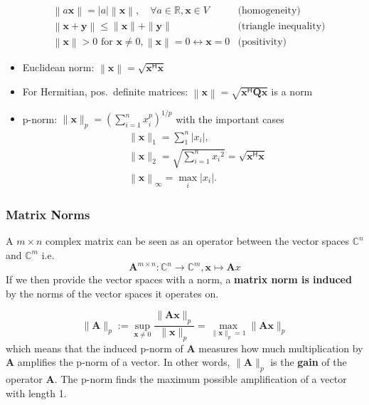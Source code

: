 \begin{align*}
     & \left\| a\mathbf{x}\right\|  =\left|a\right|\left\|\mathbf{x}\right\|,\quad\forall a\in\mathbb{R},\mathbf{x}\in V                 & \text{(homogeneity)}         \\
     & \left\|\mathbf{x}+\mathbf{y}\right\|                         \leq\|\mathbf{x}\|+\|\mathbf{y}\|                                    & \text{(triangle inequality)} \\
     & \left\|\mathbf{x}\right\|                >0 \text{ for } \mathbf{x}\neq0, \left\|\mathbf{x}\right\|=0\leftrightarrow \mathbf{x}=0 & \text{(positivity)}
\end{align*}

\begin{itemize}
    \item Euclidean norm: $\left\|\mathbf{x}\right\|=\sqrt{\mathbf{x}^{\mathsf{H}}\mathbf{x}}$
    \item For Hermitian, pos.\ definite matrices: $\left\|\mathbf{x}\right\|=\sqrt{\mathbf{x}^{\mathsf{H}} \mathbf{Qx}}$ is a norm
    \item p-norm: $\|\mathbf{x}\|_p{=\left(\sum_{i=1}^n x_i^p\right)}^{1/p}$ with the important cases
          \begin{align*}
               & \|\mathbf{x}\|_1=\sum_1^n\left|x_i\right|,                                                 \\
               & \|\mathbf{x}\|_2=\sqrt{\sum_{i=1}^n {x_i}^2} = \sqrt{\mathbf{x}^{\mathsf{H}}\mathbf{x}   } \\
               & \left\|\mathbf{x}\right\|_\infty=\max_i\left|x_i\right|.
          \end{align*}
\end{itemize}

\subsubsection{Matrix Norms}
A $m\times n$ complex matrix can be seen as an operator between the vector spaces $\mathbb{C}^n$ and $\mathbb{C}^m$ i.e.
\begin{equation*}
    \mathbf{A}^{m\times n}:\mathbb{C}^n\to\mathbb{C}^m,\mathbf{x}\mapsto \mathbf{A}x
\end{equation*}
If we then provide the vector spaces with a norm, a \textbf{matrix norm is induced} by the norms of the vector spaces it operates on.

\begin{equation*}
    \|\mathbf{A}\|_p:=\sup_{\mathbf{x}\neq0}\frac{\|\mathbf{Ax}\|_p}{\|\mathbf{x}\|_p}=\max_{\|\mathbf{x}\|_p=1}\|\mathbf{Ax}\|_p
\end{equation*}
which means that the induced p-norm of $\mathbf{A}$ measures how much multiplication by $\mathbf{A}$ amplifies the p-norm of a vector. In other words, $\|\mathbf{A}\|_p$ is the \textbf{gain} of the operator $\mathbf{A}$. The p-norm finds the maximum possible amplification of a vector with length 1.

